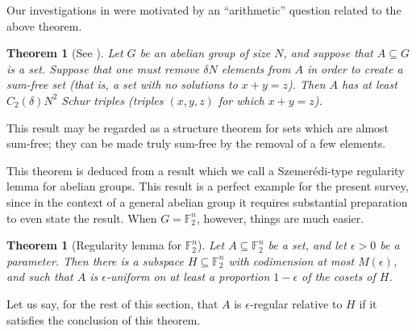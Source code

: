 \documentclass[12pt,a4paper,reqno]{amsart}
\numberwithin{equation}{section}
\theoremstyle{plain}
\newtheorem{theorem}[subsection]{Theorem}
\theoremstyle{definition}
\begin{document}
\noindent Our investigations in \cite{green-reg} were motivated by an ``arithmetic'' question related to the above theorem.
\begin{theorem}[See \cite{green-reg}] \label{almost-sum-free} Let $G$ be an abelian group of size $N$, and suppose that $A \subseteq G$ is a set. Suppose that one must remove $\delta N$ elements from $A$ in order to create a sum-free set \textup{(}that is, a set with no solutions to $x + y = z$\textup{)}. Then $A$ has at least $C_2(\delta) N^2$ Schur triples \textup{(}triples $(x,y,z)$ for which $x + y = z$\textup{)}.\end{theorem}
\noindent This result may be regarded as a structure theorem for sets which are almost sum-free; they can be made truly sum-free by the removal of a few elements.
\vspace{11pt}

\noindent This theorem is deduced from a result which we call a Szemer\'edi-type regularity lemma for abelian groups. This result is a perfect example for the present survey, since in the context of a general abelian group it requires substantial preparation to even state the result. When $G = \mathbb{F}_2^n$, however, things are much easier.

\begin{theorem}[Regularity lemma for $\mathbb{F}_2^n$]\label{reg-thm}
Let $A \subseteq \mathbb{F}_2^n$ be a set, and let $\epsilon > 0$ be a parameter. Then there is a subspace $H \subseteq \mathbb{F}_2^n$ with codimension at most $M(\epsilon)$, and such that $A$ is $\epsilon$-uniform on at least a proportion $1 - \epsilon$ of the cosets of $H$.
\end{theorem}

\noindent Let us say, for the rest of this section, that $A$ is $\epsilon$-regular relative to $H$ if it satisfies the conclusion of this theorem.\vspace{11pt}
\end{document}
